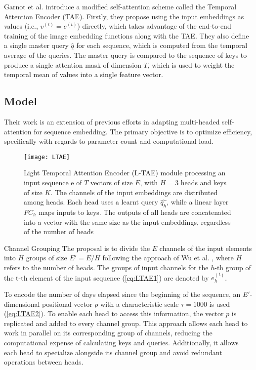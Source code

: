 Garnot et al. \cite{garnot2020satellite} introduce a modified self-attention scheme called the Temporal Attention Encoder (TAE).
Firstly, they propose using the input embeddings as values (i.e., $v^{(t)} = e^{(t)}$) directly, which takes advantage of the end-to-end training of the image embedding functions along with the TAE.
They also define a single master query $\hat{q}$ for each sequence, which is computed from the temporal average of the queries.
The master query is compared to the sequence of keys to produce a single attention mask of dimension $T$, which is used to weight the temporal mean of values into a single feature vector.



\subsection{Model}
Their work is an extension of previous efforts in adapting multi-headed self-attention for sequence embedding.
The primary objective is to optimize efficiency, specifically with regards to parameter count and computational load.

\begin{figure}[!htbp]
  \centering
  \texttt{[image: LTAE]}
  \caption{Light Temporal Attention Encoder  (L-TAE) module processing an input sequence e of $T$ vectors of
  size $E$, with $H = 3$ heads and keys of size $K$. The channels of the input embeddings
  are distributed among heads. Each head uses a learnt query $\hat{q_h}$, while a linear layer
  $FC_h$ maps inputs to keys. The outputs of all heads are concatenated into a vector with
  the same size as the input embeddings, regardless of the number of heads \cite{LTAE}}
  \label{fig:LTAErchitecture}
\end{figure}

\begin{paragraph}{Channel Grouping} 
The proposal is to divide the $E$ channels of the input elements into $H$ groups of size $E' = E/H$ following the approach of Wu et al. \cite{wu2018group}, where $H$ refers to the number of heads. The groups of input channels for the $h$-th group of the t-th element of the input sequence (\ref{eq:LTAE1}) are denoted by $e^{(t)}_h$.

To encode the number of days elapsed since the beginning of the sequence, an $E'$-dimensional positional vector $p$ with a characteristic scale $\tau = 1000$ is used (\ref{eq:LTAE2}).
To enable each head to access this information, the vector $p$ is replicated and added to every channel group.
This approach allows each head to work in parallel on its corresponding group of channels, reducing the computational expense of calculating keys and queries. Additionally, it allows each head to specialize alongside its channel group and avoid redundant operations between heads.
\end{paragraph} 

